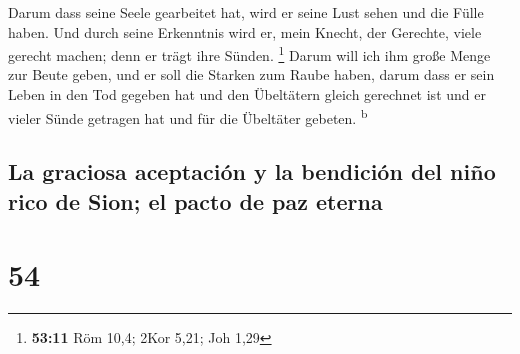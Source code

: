  Darum dass seine Seele gearbeitet hat, wird er seine
Lust sehen und die Fülle haben. Und durch seine Erkenntnis wird er, mein
Knecht, der Gerechte, viele gerecht machen; denn er trägt ihre Sünden.
\footnote{\textbf{53:11} Röm 10,4; 2Kor 5,21; Joh 1,29} 
Darum will ich ihm große Menge zur Beute geben, und er soll die Starken
zum Raube haben, darum dass er sein Leben in den Tod gegeben hat und den
Übeltätern gleich gerechnet ist und er vieler Sünde getragen hat und für
die Übeltäter gebeten. \textsuperscript{b}

\hypertarget{la-graciosa-aceptaciuxf3n-y-la-bendiciuxf3n-del-niuxf1o-rico-de-sion-el-pacto-de-paz-eterna}{%
\subsection{La graciosa aceptación y la bendición del niño rico de Sion;
el pacto de paz
eterna}\label{la-graciosa-aceptaciuxf3n-y-la-bendiciuxf3n-del-niuxf1o-rico-de-sion-el-pacto-de-paz-eterna}}

\hypertarget{section-53}{%
\section{54}\label{section-53}}

